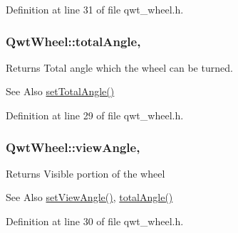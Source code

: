 Definition at line 31 of file qwt\-\_\-wheel.\-h.

\hypertarget{class_qwt_wheel_a6368f57f26c11e6577561fd584437cf3}{
\subsubsection[{total\-Angle}]{ Qwt\-Wheel\-::total\-Angle\hspace{0.3cm}{\ttfamily [read]}, {\ttfamily [write]}}}\label{class_qwt_wheel_a6368f57f26c11e6577561fd584437cf3}
\begin{DoxyReturn}{Returns}
Total angle which the wheel can be turned. 
\end{DoxyReturn}
\begin{DoxySeeAlso}{See Also}
\hyperlink{class_qwt_wheel_ae4e5dfd4c6683706716681cfd7e3d8bf}{set\-Total\-Angle()} 
\end{DoxySeeAlso}


Definition at line 29 of file qwt\-\_\-wheel.\-h.

\hypertarget{class_qwt_wheel_a63443dce4fcacb2a763de6c0aef10aee}{
\subsubsection[{view\-Angle}]{ Qwt\-Wheel\-::view\-Angle\hspace{0.3cm}{\ttfamily [read]}, {\ttfamily [write]}}}\label{class_qwt_wheel_a63443dce4fcacb2a763de6c0aef10aee}
\begin{DoxyReturn}{Returns}
Visible portion of the wheel 
\end{DoxyReturn}
\begin{DoxySeeAlso}{See Also}
\hyperlink{class_qwt_wheel_a7f15b6aef98ad6b52bebc749381bc753}{set\-View\-Angle()}, \hyperlink{class_qwt_wheel_a6368f57f26c11e6577561fd584437cf3}{total\-Angle()} 
\end{DoxySeeAlso}


Definition at line 30 of file qwt\-\_\-wheel.\-h.

